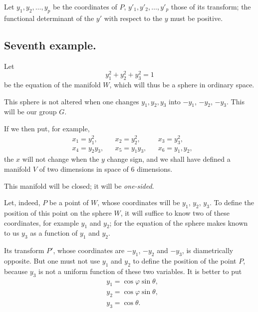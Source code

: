 \documentclass{article}
\begin{document}
Let $y_{1}, y_{2}, \ldots, y_{p}$ be the coordinates of $P$, $y'_{1}, y'_{2}, \ldots, y'_{p}$ those of its transform; the functional determinant of the $y'$ with respect to the $y$ must be positive.

\subsection*{Seventh example.}

Let
\[ y^{2}_{1} + y^{2}_{2} + y^{2}_{3} = 1 \]
be the equation of the manifold $W$, which will thus be a sphere in ordinary space.

This sphere is not altered when one changes $y_{1}, y_{2}, y_{3}$ into $-y_{1}$, $-y_{2}$, $-y_{3}$. This will be our group $G$.

If we then put, for example,
\[ \begin{aligned} &x_{1} = y^{2}_{1}, &&x_{2} = y^{2}_{2}, &&x_{3} = y^{2}_{3},\\ &x_{4} = y_{2}y_{3}, &&x_{5} = y_{1}y_{3}, &&x_{6} = y_{1}, y_{2}, \end{aligned} \]
the $x$ will not change when the $y$ change sign, and we shall have defined a manifold $V$ of two dimensions in space of 6 dimensions.

This manifold will be closed; it will be \emph{one-sided}.

Let, indeed, $P$ be a point of $W$, whose coordinates will be $y_{1}$, $y_{2}$, $y_{3}$. To define the position of this point on the sphere $W$, it will suffice to know two of these coordinates, for example $y_{1}$ and $y_{2}$; for the equation of the sphere makes known to us $y_{3}$ as a function of $y_{1}$ and $y_{2}$.

Its transform $P'$, whose coordinates are $-y_{1}$, $-y_{2}$ and $-y_{3}$, is diametrically opposite. But one must not use $y_{1}$ and $y_{2}$ to define the position of the point $P$, because $y_{3}$ is not a uniform function of these two variables. It is better to put
\[ \begin{aligned} &y_{1} = \cos \varphi \sin \theta,\\ &y_{2} = \cos \varphi \sin \theta,\\ &y_{3} = \cos \theta. \end{aligned} \]
\end{document}
